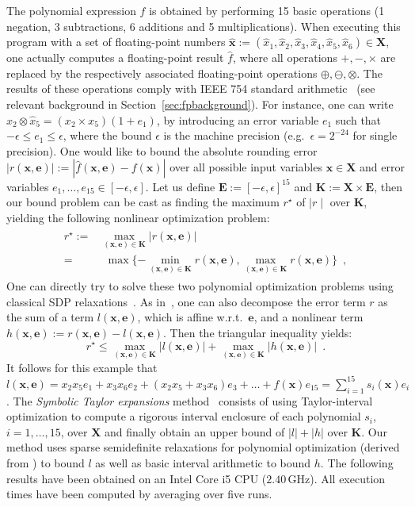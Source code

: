 \documentclass[preprint,fleqn,nocopyrightspace]{sigplanconf}
\newcommand{\x}{\mathbf{x}}
\newcommand{\e}{\mathbf{e}}
\def\E{\mathbf{E}}
\def\K{\mathbf{K}}
\def\X{\mathbf{X}}
\theoremstyle{plain}
\begin{document}
The polynomial expression $f$ is obtained by performing 15 basic operations (1 negation, 3 subtractions, 6 additions and 5 multiplications). 
When executing this program with a set of floating-point numbers $\hat{\x} :=  (\hat{x}_1, \hat{x}_2, \hat{x}_3, \hat{x}_4, \hat{x}_5, \hat{x}_6) \in \X$, one actually computes a floating-point result $\hat{f}$, where all operations $+, -, \times$ are replaced by the respectively associated floating-point operations $\oplus, \ominus, \otimes$. 
The results of these operations comply with IEEE 754 standard arithmetic~\cite{IEEE} (see relevant background in Section~\ref{sec:fpbackground}). For instance, one can write $\hat{x}_2 \otimes \hat{x}_5 =  (x_2 \times x_5) (1 + e_1)$, by introducing an error variable $e_1$ such that $-\epsilon \leq e_1 \leq \epsilon$, where the bound $\epsilon$ is the machine precision (e.g.~$\epsilon = 2^{-24}$ for single precision). One would like to bound the absolute rounding error $|r(\x, \e)| := | \hat{f}(\x, \e) - f (\x) |$ over  all possible input variables $\x \in \X$ and error variables $e_1, \dots, e_{15} \in [-\epsilon, \epsilon]$. Let us define $\E := [-\epsilon, \epsilon]^{15}$ and $\K := \X \times \E$, then our bound problem can be cast as finding the maximum $r^\star$ of $\mid r \mid$ over $\K$, yielding the following nonlinear optimization problem:
%
\begin{align}
\begin{split}
\label{eq:roptim}
r^\star := & \max_{(\x, \e) \in \K} | r(\x, \e) | \\
 = & \ \ \max \{-\min_{(\x, \e) \in \K} r(\x, \e), \max_{(\x, \e) \in \K} r(\x,\e)\} \enspace,
\end{split}
\end{align}
%
One can directly try to solve these two polynomial optimization problems using classical SDP relaxations~\cite{Lasserre01moments}.
As in~\cite{fptaylor15}, one can also decompose the error term $r$ as the sum of a term $l(\x,\e)$, which is affine w.r.t.~$\e$, and a nonlinear term $h(\x,\e) := r(\x,\e) - l(\x,\e)$. Then the triangular inequality yields:
%
\begin{equation}
\label{eq:lhoptim} 
r^\star \leq \max_{(\x, \e) \in \K} |l(\x, \e)| + \max_{(\x, \e) \in \K} |h(\x, \e)| \enspace. 
\end{equation}
%
It follows for this example that $l(\x,\e) = x_2 x_5 e_1 + x_3 x_6 e_2 +  (x_2 x_5 + x_3 x_6) e_3 + \dots + f(\x) e_{15} = \sum_{i=1}^{15} s_i(\x) e_i$. The {\em Symbolic Taylor expansions} method~\cite{fptaylor15} consists of using Taylor-interval optimization to compute a rigorous interval enclosure of each polynomial $s_i$, $i = 1,\dots,15$, over $\X$ and finally obtain an upper bound of $|l| + |h|$ over $\K$. Our method uses sparse semidefinite relaxations for polynomial optimization (derived from \cite{Las06SparseSOS}) to bound $l$ as well as basic interval arithmetic to bound $h$. The following results have been obtained on an Intel Core i5 CPU ($2.40\, $GHz). All execution times have been computed by averaging over five runs.
\end{document}
